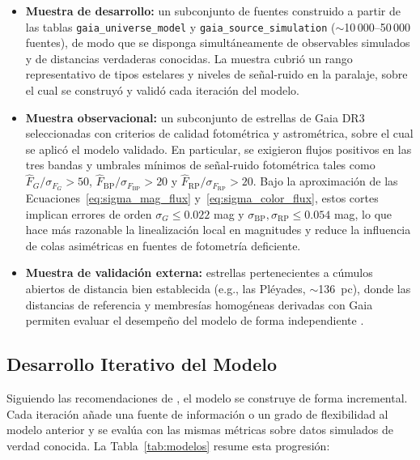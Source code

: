 \documentclass[stu, 12pt, letterpaper, donotrepeattitle, floatsintext, natbib]{apa7_ula}
\begin{document}
\begin{itemize}
    \item \textbf{Muestra de desarrollo:} un subconjunto de fuentes
    construido a partir de las tablas \texttt{gaia\_universe\_model}
    y \texttt{gaia\_source\_simulation} ($\sim$10\,000--50\,000
    fuentes), de modo que se disponga simultáneamente de observables
    simulados y de distancias verdaderas conocidas. La muestra cubrió
    un rango representativo de tipos estelares y niveles de
    señal-ruido en la paralaje, sobre el cual se construyó y
    validó cada iteración del modelo.
    \item \textbf{Muestra observacional:} un subconjunto de estrellas
    de Gaia DR3 seleccionadas con criterios de calidad fotométrica y
    astrométrica, sobre el cual se aplicó el modelo validado. En
    particular, se exigieron flujos positivos en las tres bandas y umbrales
    mínimos de señal-ruido fotométrica tales como
    $\hat{F}_G/\sigma_{F_G} > 50$,
    $\hat{F}_{\mathrm{BP}}/\sigma_{F_{\mathrm{BP}}} > 20$ y
    $\hat{F}_{\mathrm{RP}}/\sigma_{F_{\mathrm{RP}}} > 20$. Bajo la
    aproximación de las Ecuaciones~\ref{eq:sigma_mag_flux}
    y~\ref{eq:sigma_color_flux}, estos cortes implican errores de orden
    $\sigma_G \leq 0.022$ mag y
    $\sigma_{\mathrm{BP}}, \sigma_{\mathrm{RP}} \leq 0.054$ mag,
    lo que hace más razonable la linealización local en magnitudes y
    reduce la influencia de colas asimétricas en fuentes de fotometría
    deficiente.
    \item \textbf{Muestra de validación externa:} estrellas
    pertenecientes a cúmulos abiertos de distancia bien establecida
    (e.g., las Pléyades, $\sim$136~pc), donde las distancias de
    referencia y membresías homogéneas derivadas con Gaia permiten
    evaluar el desempeño del modelo de forma independiente
    \citep{CantatGaudin_2018, Galli_2017}.
\end{itemize}

\subsection{Desarrollo Iterativo del Modelo}
\label{sec:iterativo}

Siguiendo las recomendaciones de \citet{gelman2020bayesian}, el modelo
se construye de forma incremental. Cada iteración añade una fuente de
información o un grado de flexibilidad al modelo anterior y se evalúa
con las mismas métricas sobre datos simulados de verdad conocida. La
Tabla~\ref{tab:modelos} resume esta progresión:
\end{document}
